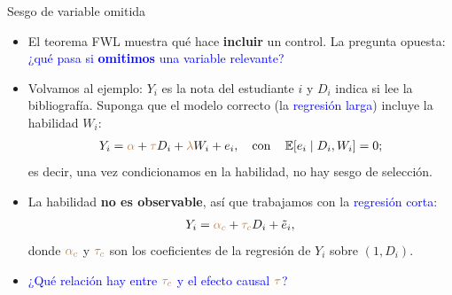 \documentclass[9pt, xcolor=dvipsnames]{beamer}
\begin{document}
\begin{frame}{Sesgo de variable omitida}
\begin{itemize}
    \item El teorema FWL muestra qué hace \textbf{incluir} un control. La pregunta opuesta: \textcolor{blue}{¿qué pasa si \textbf{omitimos} una variable relevante?}
    \item Volvamos al ejemplo: \(Y_i\) es la nota del estudiante \(i\) y \(D_i\) indica si lee la bibliografía. Suponga que el modelo correcto (la \textcolor{blue}{regresión larga}) incluye la habilidad \(W_i\):
    \begin{align}\label{EQ:regresionLarga}
        Y_i = \textcolor{brown}{\alpha} + \textcolor{brown}{\tau} D_i + \textcolor{brown}{\lambda} W_i + e_i, \quad \text{con} \quad \operatorname{\mathbb{E}}[e_i \mid D_i, W_i] = 0;
    \end{align}
    es decir, una vez condicionamos en la habilidad, no hay sesgo de selección.
    \item La habilidad \textbf{no es observable}, así que trabajamos con la \textcolor{blue}{regresión corta}:
    \begin{align}\label{EQ:regresionCorta}
        Y_i = \textcolor{brown}{\alpha_c} + \textcolor{brown}{\tau_c} D_i + \tilde{e}_i,
    \end{align}
    donde \(\textcolor{brown}{\alpha_c}\) y \(\textcolor{brown}{\tau_c}\) son los coeficientes de la regresión de \(Y_i\) sobre \((1, D_i)\).
    \item \textcolor{blue}{¿Qué relación hay entre \(\textcolor{brown}{\tau_c}\) y el efecto causal \(\textcolor{brown}{\tau}\)?}
\end{itemize}
\end{frame}
\end{document}
